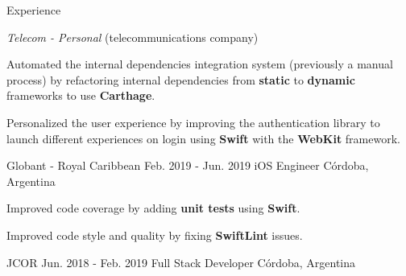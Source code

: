 \documentclass{curriculum}
\begin{document}
\begin{cvsection}{Experience}
\begin{sectionitemlist}
        \item{\textit{Telecom - Personal} (telecommunications company)}
            \begin{sectionitemlist}
            \item{
                Automated the internal dependencies integration system
                (previously a manual process) by refactoring internal dependencies
                from \textbf{static} to \textbf{dynamic} frameworks to use \textbf{Carthage}.
            }
            \item{
                Personalized the user experience by improving the authentication
                library to launch different experiences on login using
                \textbf{Swift} with the \textbf{WebKit} framework.
            }
            \end{sectionitemlist}

        \end{sectionitemlist}


    \makesectionitemheader
        {Globant - Royal Caribbean}                         {Feb. 2019 - Jun. 2019}
        {iOS Engineer}                                         {Córdoba, Argentina}

        \begin{sectionitemlist}
        \item{Improved code coverage by adding \textbf{unit tests} using \textbf{Swift}.}
        \item{Improved code style and quality by fixing \textbf{SwiftLint} issues.}
        \end{sectionitemlist}


    \makesectionitemheader
        {JCOR}                                              {Jun. 2018 - Feb. 2019}
        {Full Stack Developer}                                 {Córdoba, Argentina}

        \begin{sectionitemlist}


\end{sectionitemlist}
\end{cvsection}
\end{document}

